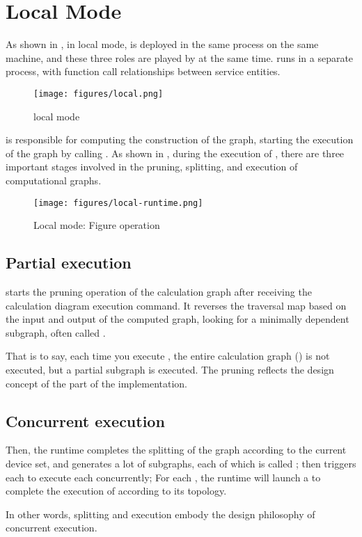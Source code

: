 \section{Local Mode}
\label{sec:local-runtime}
\begin{content}
As shown in , in local mode,  is deployed in the same process on the same machine, and these three roles are played by  at the same time.  runs in a separate process, with function call relationships between service entities.

\begin{figure}[H]
  \centering
  \texttt{[image: figures/local.png]}
  \caption{local mode}
  \label{fig:local}
\end{figure}

 is responsible for computing the construction of the graph, starting the execution of the graph by calling . As shown in , during the execution of , there are three important stages involved in the pruning, splitting, and execution of computational graphs.

\begin{figure}[H]
  \centering
  \texttt{[image: figures/local-runtime.png]}
  \caption{Local mode: Figure operation}
  \label{fig:local-runtime}
\end{figure}


\subsection{Partial execution}
 starts the pruning operation of the calculation graph after receiving the calculation diagram execution command. It reverses the traversal map based on the input and output of the computed graph, looking for a minimally dependent subgraph, often called .

That is to say, each time you execute , the entire calculation graph () is not executed, but a partial subgraph is executed. The pruning reflects the design concept of the \tf{} part of the implementation.


\subsection{Concurrent execution}
Then, the runtime completes the splitting of the graph according to the current device set, and generates a lot of subgraphs, each of which is called ; then triggers each  to execute each  concurrently; For each , the runtime will launch a  to complete the execution of  according to its topology.

In other words, splitting and execution embody the design philosophy of \tf{} concurrent execution.

\end{content}


